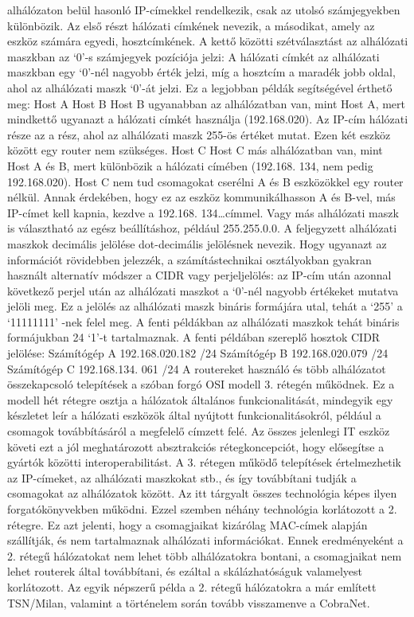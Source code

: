 alhálózaton belül hasonló IP-címekkel rendelkezik, csak az utolsó számjegyekben
különbözik. Az első részt hálózati címkének nevezik, a másodikat, amely az
eszköz számára egyedi, hosztcímkének. A kettő közötti szétválasztást az
alhálózati maszkban az `0'-s számjegyek pozíciója jelzi: A hálózati címkét az
alhálózati maszkban egy `0'-nél nagyobb érték jelzi, míg a hosztcím a maradék
jobb oldal, ahol az alhálózati maszk `0'-át jelzi. Ez a legjobban példák
segítségével érthető meg: Host A Host B  Host B ugyanabban az alhálózatban van,
mint Host A, mert mindkettő ugyanazt a hálózati címkét használja (192.168.020).
Az IP-cím hálózati része az a rész, ahol az alhálózati maszk 255-ös értéket
mutat. Ezen két eszköz között egy router nem szükséges. Host C  Host C más
alhálózatban van, mint Host A és B, mert különbözik a hálózati címében (192.168.
134, nem pedig 192.168.020). Host C nem tud csomagokat cserélni A és B
eszközökkel egy router nélkül. Annak érdekében, hogy ez az eszköz
kommunikálhasson A és B-vel, más IP-címet kell kapnia, kezdve a 192.168.
134\ldots címmel. Vagy más alhálózati maszk is választható az egész beállításhoz,
például 255.255.0.0. A feljegyzett alhálózati maszkok decimális jelölése
dot-decimális jelölésnek nevezik. Hogy ugyanazt az információt rövidebben
jelezzék, a számítástechnikai osztályokban gyakran használt alternatív módszer a
CIDR vagy perjeljelölés: az IP-cím után azonnal következő perjel után az
alhálózati maszkot a `0'-nél nagyobb értékeket mutatva jelöli meg. Ez a jelölés
az alhálózati maszk bináris formájára utal, tehát a `255' a `11111111' -nek
felel meg. A fenti példákban az alhálózati maszkok tehát bináris formájukban 24
`1'-t tartalmaznak. A fenti példában szereplő hosztok CIDR jelölése: Számítógép
A 192.168.020.182 /24 Számítógép B 192.168.020.079 /24 Számítógép C 192.168.134.
061 /24 A routereket használó és több alhálózatot összekapcsoló telepítések a
szóban forgó OSI modell 3. rétegén működnek. Ez a modell hét rétegre osztja a
hálózatok általános funkcionalitását, mindegyik egy készletet leír a hálózati
eszközök által nyújtott funkcionalitásokról, például a csomagok továbbításáról a
megfelelő címzett felé. Az összes jelenlegi IT eszköz követi ezt a jól
meghatározott absztrakciós rétegkoncepciót, hogy elősegítse a gyártók közötti
interoperabilitást. A 3. rétegen működő telepítések értelmezhetik az IP-címeket,
az alhálózati maszkokat stb., és így továbbítani tudják a csomagokat az
alhálózatok között. Az itt tárgyalt összes technológia képes ilyen
forgatókönyvekben működni. Ezzel szemben néhány technológia korlátozott a 2.
rétegre. Ez azt jelenti, hogy a csomagjaikat kizárólag MAC-címek alapján
szállítják, és nem tartalmaznak alhálózati információkat. Ennek eredményeként a
2. rétegű hálózatokat nem lehet több alhálózatokra bontani, a csomagjaikat nem
lehet routerek által továbbítani, és ezáltal a skálázhatóságuk valamelyest
korlátozott. Az egyik népszerű példa a 2. rétegű hálózatokra a már említett
TSN/Milan, valamint a történelem során tovább visszamenve a CobraNet.

